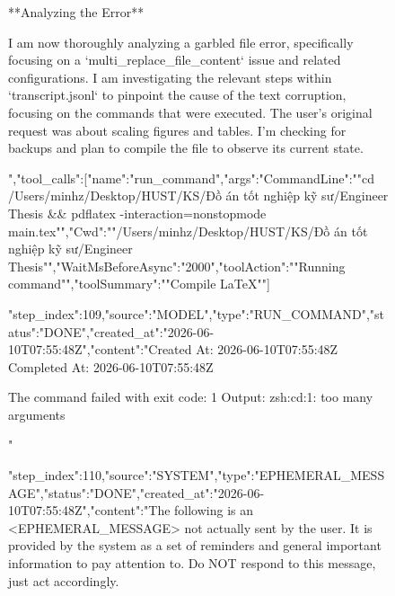 \begin{figure}[htbp]
{{**Analyzing the Error**

I am now thoroughly analyzing a garbled file error, specifically focusing on a `multi_replace_file_content` issue and related configurations. I am investigating the relevant steps within `transcript.jsonl` to pinpoint the cause of the text corruption, focusing on the commands that were executed. The user's original request was about scaling figures and tables. I'm checking for backups and plan to compile the file to observe its current state.


","tool_calls":[{"name":"run_command","args":{"CommandLine":""cd /Users/minhz/Desktop/HUST/KS/Đồ án tốt nghiệp kỹ sư/Engineer\\ Thesis && pdflatex -interaction=nonstopmode main.tex"","Cwd":""/Users/minhz/Desktop/HUST/KS/Đồ án tốt nghiệp kỹ sư/Engineer Thesis"","WaitMsBeforeAsync":"2000","toolAction":""Running command"","toolSummary":""Compile LaTeX""}}]}
{"step_index":109,"source":"MODEL","type":"RUN_COMMAND","status":"DONE","created_at":"2026-06-10T07:55:48Z","content":"Created At: 2026-06-10T07:55:48Z
Completed At: 2026-06-10T07:55:48Z

				The command failed with exit code: 1
				Output:
				zsh:cd:1: too many arguments

"}
{"step_index":110,"source":"SYSTEM","type":"EPHEMERAL_MESSAGE","status":"DONE","created_at":"2026-06-10T07:55:48Z","content":"The following is an <EPHEMERAL_MESSAGE> not actually sent by the user. It is provided by the system as a set of reminders and general important information to pay attention to. Do NOT respond to this message, just act accordingly.

}}
\end{figure}
